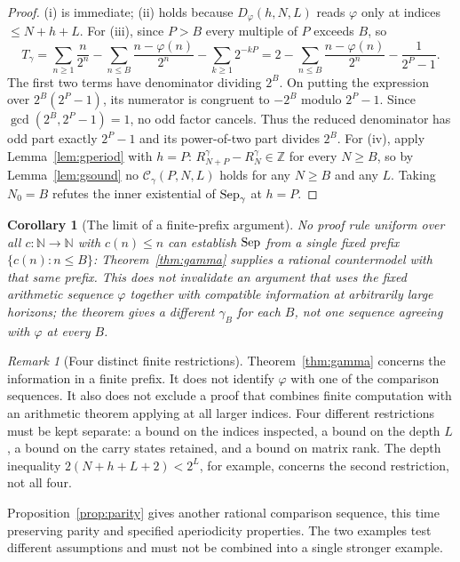 \documentclass[11pt]{article}
\theoremstyle{plain}
\newtheorem{cor}[thm]{Corollary}
\theoremstyle{definition}
\theoremstyle{remark}
\newtheorem{rem}[thm]{Remark}
\let\origmathrm\mathrm
\renewcommand{\mathrm}[1]{\ifmmode\origmathrm{#1}\else\textrm{#1}\fi}%
\newcommand{\N}{\mathbb{N}}
\newcommand{\Z}{\mathbb{Z}}
\begin{document}
\begin{proof}
(i) is immediate; (ii) holds because $D_\varphi(h,N,L)$ reads $\varphi$ only at
indices $\le N{+}h{+}L$. For (iii), since $P > B$ every multiple of $P$ exceeds
$B$, so
\[
  T_\gamma
  = \sum_{n\ge1}\frac{n}{2^{n}} - \sum_{n \le B}\frac{n - \varphi(n)}{2^{n}}
    - \sum_{k \ge 1} 2^{-kP}
  = 2 - \sum_{n \le B}\frac{n-\varphi(n)}{2^{n}} - \frac{1}{2^{P}-1}.
\]
The first two terms have denominator dividing $2^B$. On putting the
expression over $2^B(2^P-1)$, its numerator is congruent to $-2^B$ modulo
$2^P-1$. Since $\gcd(2^B,2^P-1)=1$, no odd factor cancels. Thus the
reduced denominator has odd part exactly $2^P-1$ and its power-of-two part
divides $2^B$. For (iv), apply Lemma~\ref{lem:gperiod} with $h=P$:
$R^{\gamma}_{N+P} - R^{\gamma}_{N} \in \Z$ for every $N \ge B$, so by
Lemma~\ref{lem:gsound} no $\mathcal C_\gamma(P,N,L)$ holds for any
$N \ge B$ and any $L$. Taking $N_0 = B$ refutes the inner existential of
$\mathrm{Sep}_\gamma$ at $h = P$.
\end{proof}

\begin{cor}[The limit of a finite-prefix argument]
\label{cor:b1}
No proof rule uniform over all $c:\N\to\N$ with $c(n)\le n$ can
establish $\mathrm{Sep}$ from a single fixed prefix
$\{c(n):n\le B\}$: Theorem~\ref{thm:gamma} supplies a rational countermodel
with that same prefix.  This does \emph{not} invalidate an argument that uses
the fixed arithmetic sequence $\varphi$ together with compatible information
at arbitrarily large horizons; the theorem gives a different $\gamma_B$ for
each $B$, not one sequence agreeing with $\varphi$ at every $B$.
\end{cor}

\begin{rem}[Four distinct finite restrictions]
\label{rem:b1-scope}
Theorem~\ref{thm:gamma} concerns the information in a finite prefix.
It does not identify $\varphi$ with one of the comparison sequences. It also
does not exclude a proof that combines finite computation with an arithmetic
theorem applying at all larger indices. Four different restrictions must
be kept separate: a bound on the indices inspected, a bound on the depth
$L$, a bound on the carry states retained, and a bound on matrix rank.
The depth inequality $2(N+h+L+2)<2^L$, for example, concerns the second
restriction, not all four.
\end{rem}

Proposition~\ref{prop:parity} gives another rational comparison sequence,
this time preserving parity and specified aperiodicity properties. The two
examples test different assumptions and must not be combined into a single
stronger example.
\end{document}
